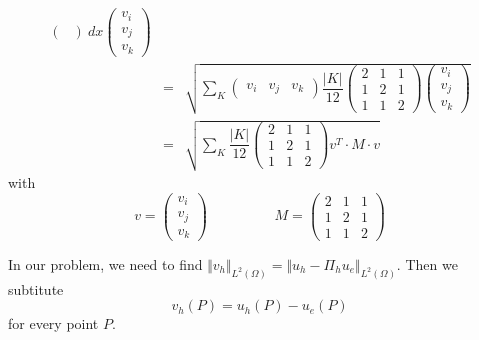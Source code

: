 \documentclass[a4paper,10pt]{article}
\begin{document}
\begin{eqnarray}
{\begin{pmatrix}
	\end{pmatrix}
	\ dx
	\begin{pmatrix}
	v_{i} \\ v_{j} \\ v_{k}
	\end{pmatrix}} \\ \nonumber
&=& \sqrt{ \sum_{K}
	\begin{pmatrix}
	v_{i} & v_{j} & v_{k}
	\end{pmatrix}
	\dfrac{\vert K \vert}{12}
	\begin{pmatrix}
	2 & 1 & 1 \\ 1 & 2 & 1 \\ 1 & 1 & 2
	\end{pmatrix}
	\begin{pmatrix}
	v_{i} \\ v_{j} \\ v_{k}
	\end{pmatrix}} \\ \nonumber
&=& \sqrt{ \sum_{K}
	\dfrac{\vert K \vert}{12}
	\begin{pmatrix}
	2 & 1 & 1 \\ 1 & 2 & 1 \\ 1 & 1 & 2
	\end{pmatrix}
	v^{T} \cdot M \cdot v
	}
\end{eqnarray}
with
\[ v = \begin{pmatrix}
v_{i} \\ v_{j} \\ v_{k}
\end{pmatrix} \hspace{2cm}
M = \begin{pmatrix}
2 & 1 & 1 \\ 1 & 2 & 1 \\ 1 & 1 & 2
\end{pmatrix}  \]

In our problem, we need to find $ \Vert v_{h} \Vert_{L^2(\Omega)} = \Vert u_{h} - \Pi_{h}u_{e} \Vert_{L^2(\Omega)} $. Then we subtitute
\[ v_{h}(P) = u_{h}(P) - u_{e}(P) \]
for every point $ P $.
\end{document}

